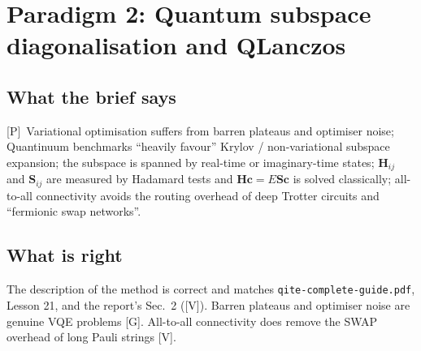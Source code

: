 \documentclass[11pt,a4paper]{article}
\newcommand{\report}{the report}
\newcommand{\lP}{\textcolor{keyblue}{[P]}}   %
\newcommand{\lV}{\textcolor{keyblue}{[V]}}   %
\newcommand{\lG}{\textcolor{alertred}{[G]}}  %
\begin{document}
\section{Paradigm 2: Quantum subspace diagonalisation and QLanczos}\label{sec:p2}

\subsection{What the brief says}
\lP\ Variational optimisation suffers from barren plateaus and optimiser noise; Quantinuum benchmarks ``heavily favour'' Krylov / non-variational subspace expansion; the subspace is spanned by real-time or imaginary-time states; $\mathbf H_{ij}$ and $\mathbf S_{ij}$ are measured by Hadamard tests and $\mathbf H\mathbf c=E\mathbf S\mathbf c$ is solved classically; all-to-all connectivity avoids the routing overhead of deep Trotter circuits and ``fermionic swap networks''.

\subsection{What is right}
The description of the method is correct and matches \texttt{qite-complete-guide.pdf}, Lesson 21, and \report's Sec.~2 (\lV). Barren plateaus and optimiser noise are genuine VQE problems \lG. All-to-all connectivity does remove the SWAP overhead of long Pauli strings \lV.
\end{document}
